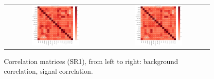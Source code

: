 \begin{figure}[tbh!]
 \begin{center}
 \begin{tabular}{cc}
  \includegraphics[width=0.48\textwidth]{figures/Part3/BDT/corr_bkg_SR1}&
  \includegraphics[width=0.48\textwidth]{figures/Part3/BDT/corr_signal_SR1}\\
 \end{tabular}
 \caption{Correlation matrices (SR1), from left to right: background correlation, signal correlation.}
 \label{fig:Corr1}
 \end{center}
\end{figure}


